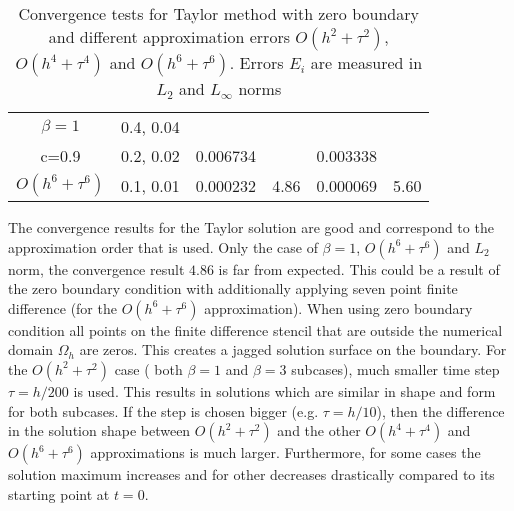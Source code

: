 \documentclass{article}
\begin{document}
\begin{table}[ht]
\begin{tabular}{||c|l|ll|ll||}
    \hline
  $\beta=1$     &0.4, 0.04   &            &          &                  &      \\
      c=0.9                    &0.2, 0.02   &0.006734 &           & 0.003338      &       \\
     $O(h^6+ \tau^6)$ &0.1, 0.01 & 0.000232 &4.86 & 0.000069  & 5.60        \\
	   \hline
			\hline 
		\end{tabular}
		\caption{Convergence tests for Taylor method with zero boundary and different approximation errors $O(h^{2} + \tau^2 )$, $O(h^{4} + \tau^4 )$ and $O(h^{6} + \tau^6 )$. Errors $E_i$ are measured in $L_2$ and $L_\infty$ norms}
\label{table:A}
\end{table}

The convergence results for the Taylor solution are good and correspond to the approximation order that is used. Only the case of $\beta = 1$, $O(h^6 + \tau^6)$ and $L_2$ norm, the convergence result $4.86$ is far from expected. This could be a result of the zero boundary condition with additionally applying seven point finite difference (for the $O(h^6 + \tau^6)$ approximation). When using zero boundary condition all points on the finite difference stencil that are outside the numerical domain $\Omega_h$ are zeros. This creates a jagged solution surface on the boundary. For the $O(h^2 + \tau^2)$ case ( both $\beta = 1$ and $\beta = 3$ subcases), much smaller time step  $\tau = h/200$ is used. This results in solutions which are similar in shape and form for both subcases. If the step is chosen bigger (e.g. $\tau = h/10$), then the difference in the solution shape between $O(h^2 + \tau^2)$ and the other $O(h^4 + \tau^4)$ and $O(h^6 + \tau^6)$ approximations is much larger. Furthermore, for some cases the solution maximum increases and for other decreases drastically compared to its starting point at $t=0$.
\end{document}
